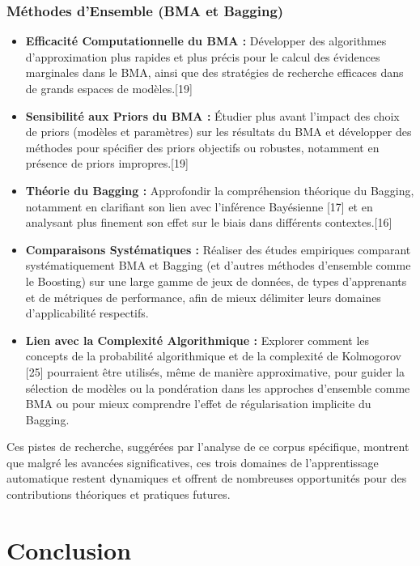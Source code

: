 \documentclass[11pt,a4paper]{article}
\begin{document}
\subsubsection{Méthodes d'Ensemble (BMA et Bagging)}
\begin{itemize}
    \item \textbf{Efficacité Computationnelle du BMA :} Développer des algorithmes d'approximation plus rapides et plus précis pour le calcul des évidences marginales dans le BMA, ainsi que des stratégies de recherche efficaces dans de grands espaces de modèles.[19]
    \item \textbf{Sensibilité aux Priors du BMA :} Étudier plus avant l'impact des choix de priors (modèles et paramètres) sur les résultats du BMA et développer des méthodes pour spécifier des priors objectifs ou robustes, notamment en présence de priors impropres.[19]
    \item \textbf{Théorie du Bagging :} Approfondir la compréhension théorique du Bagging, notamment en clarifiant son lien avec l'inférence Bayésienne [17] et en analysant plus finement son effet sur le biais dans différents contextes.[16]
    \item \textbf{Comparaisons Systématiques :} Réaliser des études empiriques comparant systématiquement BMA et Bagging (et d'autres méthodes d'ensemble comme le Boosting) sur une large gamme de jeux de données, de types d'apprenants et de métriques de performance, afin de mieux délimiter leurs domaines d'applicabilité respectifs.
    \item \textbf{Lien avec la Complexité Algorithmique :} Explorer comment les concepts de la probabilité algorithmique et de la complexité de Kolmogorov [25] pourraient être utilisés, même de manière approximative, pour guider la sélection de modèles ou la pondération dans les approches d'ensemble comme BMA ou pour mieux comprendre l'effet de régularisation implicite du Bagging.
\end{itemize}

Ces pistes de recherche, suggérées par l'analyse de ce corpus spécifique, montrent que malgré les avancées significatives, ces trois domaines de l'apprentissage automatique restent dynamiques et offrent de nombreuses opportunités pour des contributions théoriques et pratiques futures.

\section{Conclusion}
\end{document}
